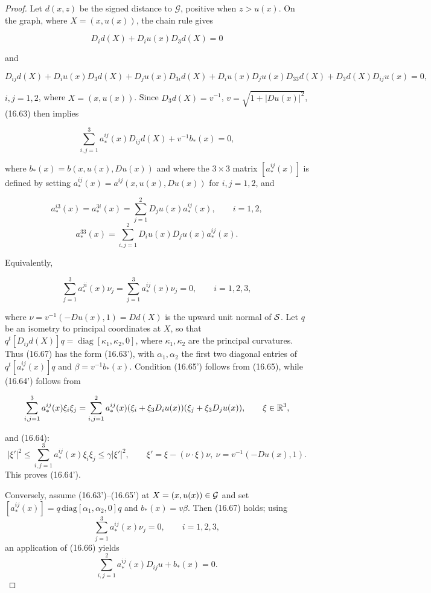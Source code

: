 \begin{proof}
\sketch Let $d(x,z)$ be the signed distance to $\mathcal G$, positive when
$z>u(x)$.  On the graph, where $X=(x,u(x))$, the chain rule gives

\[
D_i d(X)+D_i u(x)D_3 d(X)=0
\]

and

\begin{equation}
D_{ij}d(X)+D_i u(x)D_3 d(X)+D_j u(x)D_{3i}d(X)+D_i u(x)D_j u(x)D_{33}d(X)
+D_3 d(X)D_{ij}u(x)=0,
\tag{16.66}
\end{equation}

$i,j=1,2$, where $X=(x,u(x))$. Since $D_3 d(X)=v^{-1}$, $v=\sqrt{1+|Du(x)|^2}$, (16.63)
then implies

\begin{equation}
\sum_{i,j=1}^3 a_*^{ij}(x)D_{ij}d(X)+v^{-1}b_*(x)=0,
\tag{16.67}
\end{equation}

where $b_*(x)=b(x,u(x),Du(x))$ and where the $3\times 3$ matrix $[a_*^{ij}(x)]$ is defined by
setting $a_*^{ij}(x)=a^{ij}(x,u(x),Du(x))$ for $i,j=1,2$, and

\[
a_*^{i3}(x)=a_*^{3i}(x)=\sum_{j=1}^2 D_j u(x)a_*^{ij}(x),\qquad i=1,2,
\]
\[
a_*^{33}(x)=\sum_{i,j=1}^2 D_i u(x)D_j u(x)a_*^{ij}(x).
\]

Equivalently,

\[
\sum_{j=1}^3 a_*^{ji}(x)\nu_j=\sum_{j=1}^3 a_*^{ij}(x)\nu_j=0,\qquad i=1,2,3,
\]

where $\nu=v^{-1}(-Du(x),1)=Dd(X)$ is the upward unit normal of $\mathcal{S}$.
Let $q$ be an isometry to principal coordinates at $X$, so that
$q^t[D_{ij}d(X)]q=\operatorname{diag}[\kappa_1,\kappa_2,0]$,
where $\kappa_1,\kappa_2$ are the principal curvatures. Thus (16.67) has the
form (16.63'), with $\alpha_1,\alpha_2$ the first two diagonal entries of
$q^t[a_*^{ij}(x)]q$ and $\beta=v^{-1}b_*(x)$. Condition (16.65') follows
from (16.65), while (16.64') follows from

\[
\sum_{i,j=1}^3 a_*^{ij}(x)\xi_i\xi_j=\sum_{i,j=1}^2 a_*^{ij}(x)(\xi_i+\xi_3D_i u(x))(\xi_j+\xi_3D_j u(x)),\qquad \xi\in \mathbb{R}^3,
\]



and (16.64):
\[
|\xi'|^2 \le \sum_{i,j=1}^3 a_*^{ij}(x)\xi_i\xi_j \le \gamma|\xi'|^2, \qquad \xi' = \xi - (\nu\cdot \xi)\nu,\ \nu = v^{-1}(-Du(x),1).
\]
This proves (16.64').

Conversely, assume (16.63')--(16.65') at $X=(x,u(x))\in\mathcal{G}$ and set
$[a_*^{ij}(x)]=q\,\mathrm{diag}[\alpha_1,\alpha_2,0]q$ and
$b_*(x)=v\beta$. Then (16.67) holds; using
\[
\sum_{j=1}^3 a_*^{ij}(x)\nu_j=0, \qquad i=1,2,3,
\]
an application of (16.66) yields
\[
\sum_{i,j=1}^2 a_*^{ij}(x)D_{ij}u+b_*(x)=0.
\]


\end{proof}
